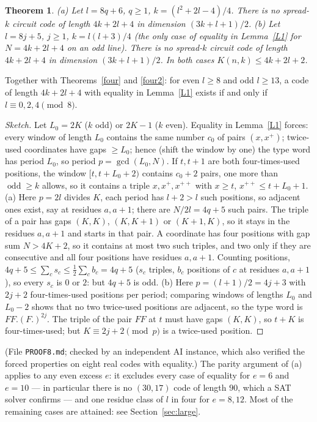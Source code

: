 \documentclass[11pt]{article}
\newtheorem{theorem}{Theorem}
\theoremstyle{remark}
\newcommand{\odd}{\operatorname{odd}}
\begin{document}
\begin{theorem}\label{none}
{\rm (a)} Let $l=8q+6$, $q\ge1$, $k=(l^2+2l-4)/4$. There is no spread-$k$ circuit code of length $4k+2l+4$ in dimension $(3k+l+1)/2$.
{\rm (b)} Let $l=8j+5$, $j\ge1$, $k=l(l+3)/4$ (the only case of equality in Lemma~\ref{L1} for $N=4k+2l+4$ on an odd line).
There is no spread-$k$ circuit code of length $4k+2l+4$ in dimension $(3k+l+1)/2$.
In both cases $K(n,k)\le 4k+2l+2$.
\end{theorem}
\noindent Together with Theorems~\ref{four} and \ref{four2}: for even $l\ge8$ and odd $l\ge13$, a code of length $4k+2l+4$ with
equality in Lemma~\ref{L1} exists if and only if $l\equiv 0,2,4\pmod 8$.
\begin{proof}[Sketch]
Let $L_0=2K$ ($k$ odd) or $2K-1$ ($k$ even). Equality in Lemma~\ref{L1} forces: every window of length $L_0$ contains the same
number $c_0$ of pairs $(x,x^+)$; twice-used coordinates have gaps $\ge L_0$; hence (shift the window by one) the type word has period
$L_0$, so period $p=\gcd(L_0,N)$. If $t,t+1$ are both four-times-used positions, the window $[t,t+L_0+2)$ contains $c_0+2$ pairs,
one more than $\odd\ge k$ allows, so it contains a triple $x,x^+,x^{++}$ with $x\ge t$, $x^{++}\le t+L_0+1$.
(a) Here $p=2l$ divides $K$, each period has $l+2>l$ such positions, so adjacent ones exist, say at residues $a,a+1$; there are
$N/2l=4q+5$ such pairs. The triple of a pair has gaps $(K,K)$, $(K,K+1)$ or $(K+1,K)$, so it stays in the residues $a,a+1$ and starts in that pair.
A coordinate has four positions with gap sum $N>4K+2$, so it contains at most two such triples, and two only if they are
consecutive and all four positions have residues $a,a+1$. Counting positions, $4q+5\le\sum_c s_c\le\frac12\sum_c b_c=4q+5$
($s_c$ triples, $b_c$ positions of $c$ at residues $a,a+1$), so every $s_c$ is $0$ or $2$: but $4q+5$ is odd.
(b) Here $p=(l+1)/2=4j+3$ with $2j+2$ four-times-used positions per period; comparing windows of lengths $L_0$ and $L_0-2$ shows that
no two twice-used positions are adjacent, so the type word is $FF.(F.)^{2j}$. The triple of the pair $FF$ at $t$ must have gaps $(K,K)$,
so $t+K$ is four-times-used; but $K\equiv 2j+2\pmod p$ is a twice-used position.
\end{proof}
\noindent (File \texttt{PROOF8.md}; checked by an independent AI instance, which also verified the forced properties on eight real
codes with equality.) The parity argument of (a) applies to any even excess $e$: it excludes every case of equality for $e=6$ and
$e=10$ --- in particular there is no $(30,17)$ code of length $90$, which a SAT solver confirms --- and one residue class of $l$ in four
for $e=8,12$. Most of the remaining cases are attained: see Section~\ref{sec:large}.
\end{document}
